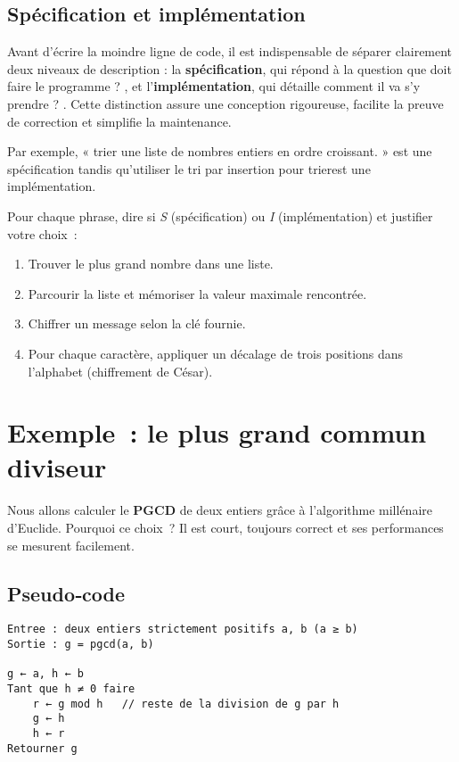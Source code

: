 \subsection{Spécification et implémentation}

Avant d’écrire la moindre ligne de code, il est indispensable de
séparer clairement deux niveaux de description : la \textbf{spécification},
qui répond à la question \og que doit faire le programme ? \fg{}, et
l’\textbf{implémentation}, qui détaille \og comment il va s’y prendre ? \fg{}.
Cette distinction assure une conception rigoureuse, facilite la preuve de
correction et simplifie la maintenance.


Par exemple, « trier une liste de nombres entiers en ordre croissant. » est une spécification tandis qu'\og utiliser le tri par insertion pour trier\fg est une implémentation.


\begin{exercice}
Pour chaque phrase, dire si \emph{S} (spécification) ou \emph{I} (implémentation)
et justifier votre choix :
\begin{enumerate}[label=\alph*)]
  \item \og Trouver le plus grand nombre dans une liste. \fg{}
  \item \og Parcourir la liste et mémoriser la valeur maximale rencontrée. \fg{}
  \item \og Chiffrer un message selon la clé fournie. \fg{}
  \item \og Pour chaque caractère, appliquer un décalage de trois positions dans
        l’alphabet (chiffrement de César). \fg{}
\end{enumerate}
\end{exercice}

\section{Exemple : le plus grand commun diviseur}

Nous allons calculer le \textbf{PGCD} de deux entiers grâce à l’algorithme
millénaire d’Euclide. Pourquoi ce choix ? Il est court, toujours correct et ses
performances se mesurent facilement.

\subsection{Pseudo‑code}
\begin{lstlisting}[caption={Algorithme d'Euclide (version itérative)}]
Entree : deux entiers strictement positifs a, b (a ≥ b)
Sortie : g = pgcd(a, b)

g ← a, h ← b
Tant que h ≠ 0 faire
    r ← g mod h   // reste de la division de g par h
    g ← h
    h ← r
Retourner g
\end{lstlisting}

